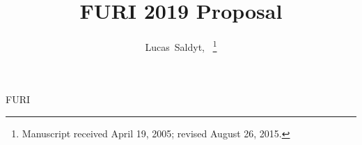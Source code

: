 \documentclass[journal]{IEEEtran}
\begin{document}
%
\title{FURI 2019 Proposal}
%
%
%

\author{Lucas~Saldyt,~
\thanks{Manuscript received April 19, 2005; revised August 26, 2015.}}

% 
%

%
{FURI}
% 

\end{document}
